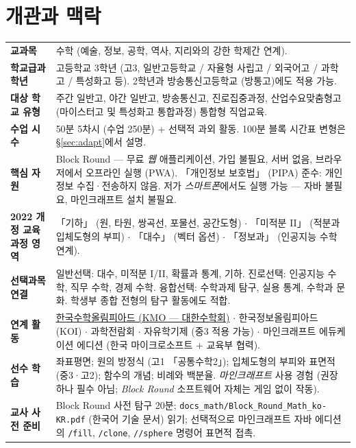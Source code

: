 \documentclass[12pt,a4paper]{scrartcl}
\newcommand{\cmd}[1]{\textcolor{earth}{\texttt{\small #1}}}
\begin{document}
\renewcommand{\contentsname}{\color{accent}목차}
\tableofcontents
\thispagestyle{fancy}
\newpage

\section{개관과 맥락}\label{sec:identificacao}

\begin{center}
\begin{tabular}{@{}p{}p{}@{}}
\toprule
\textbf{교과목} & 수학 (예술, 정보, 공학, 역사, 지리와의 강한 학제간 연계). \\
\addlinespace[2pt]
\textbf{학교급과 학년} & 고등학교 3학년 (고3, 일반고등학교 / 자율형 사립고 / 외국어고 / 과학고 / 특성화고 등). 2학년과 방송통신고등학교 (방통고)에도 적용 가능. \\
\addlinespace[2pt]
\textbf{대상 학교 유형} & 주간 일반고, 야간 일반고, 방송통신고, 진로집중과정, 산업수요맞춤형고 (마이스터고 및 특성화고 통합과정) 통합형 직업교육. \\
\addlinespace[2pt]
\textbf{수업 시수} & 50분 5차시 (수업 250분) + 선택적 과외 활동. 100분 블록 시간표 변형은 §\ref{sec:adapt}에서 설명. \\
\addlinespace[2pt]
\textbf{핵심 자원} & Block Round --- 무료 \emph{웹} 애플리케이션, 가입 불필요, 서버 없음, 브라우저에서 오프라인 실행 (PWA). 「개인정보 보호법」 (PIPA) 준수: 개인정보 수집·전송하지 않음. 저가 \emph{스마트폰}에서도 실행 가능 --- 자바 불필요, 마인크래프트 설치 불필요. \\
\addlinespace[2pt]
\textbf{2022 개정 교육과정 영역} & 「기하」 (원, 타원, 쌍곡선, 포물선, 공간도형) $\cdot$ 「미적분 II」 (적분과 입체도형의 부피) $\cdot$ 「대수」 (벡터 옵션) $\cdot$ 「정보과」 (인공지능 수학 연계). \\
\addlinespace[2pt]
\textbf{선택과목 연결} & 일반선택: 대수, 미적분 I/II, 확률과 통계, 기하. 진로선택: 인공지능 수학, 직무 수학, 경제 수학. 융합선택: 수학과제 탐구, 실용 통계, 수학과 문화. 학생부 종합 전형의 탐구 활동에도 적합. \\
\addlinespace[2pt]
\textbf{연계 활동} & \hyperref[sec:olympiad]{한국수학올림피아드 (KMO --- 대한수학회)} $\cdot$ 한국정보올림피아드 (KOI) $\cdot$ 과학전람회 $\cdot$ 자유학기제 (중3 적용 가능) $\cdot$ 마인크래프트 에듀케이션 에디션 (한국 마이크로소프트 + 교육부 협력). \\
\addlinespace[2pt]
\textbf{선수 학습} & 좌표평면; 원의 방정식 (고1 「공통수학2」); 입체도형의 부피와 표면적 (중3·고2); 함수의 개념; 비례와 백분율. \emph{마인크래프트} 사용 경험 (권장하나 필수 아님; \emph{Block Round} 소프트웨어 자체는 게임 없이 작동). \\
\addlinespace[2pt]
\textbf{교사 사전 준비} & Block Round 사전 탐구 20분; \texttt{docs\_math/Block\_Round\_Math\_ko-KR.pdf} (한국어 기술 문서) 읽기; 선택적으로 마인크래프트 자바 에디션의 \cmd{/fill}, \cmd{/clone}, \cmd{//sphere} 명령어 표면적 접촉. \\
\bottomrule
\end{tabular}
\end{center}
\end{document}
